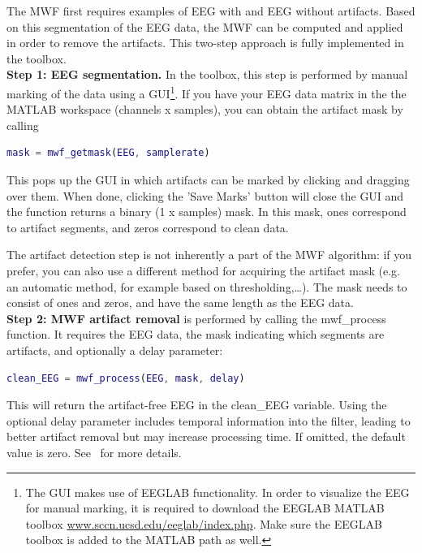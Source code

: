 \documentclass[11pt]{article}
\begin{document}
The MWF first requires examples of EEG with and EEG without artifacts. Based on this segmentation of the EEG data, the MWF can be computed and applied in order to remove the artifacts. This two-step approach is fully implemented in the toolbox.
\\

\textbf{Step 1: EEG segmentation.} In the toolbox, this step is performed by manual marking of the data using a GUI\footnote{The GUI makes use of EEGLAB functionality. In order to visualize the EEG for manual marking, it is required to download the EEGLAB MATLAB toolbox \url{www.sccn.ucsd.edu/eeglab/index.php}. Make sure the EEGLAB toolbox is added to the MATLAB path as well.}. If you have your EEG data matrix in the the MATLAB workspace (channels x samples), you can obtain the artifact mask by calling

\begin{lstlisting}[frame=single, language=matlab]
    mask = mwf_getmask(EEG, samplerate)
\end{lstlisting}

This pops up the GUI in which artifacts can be marked by clicking and dragging over them. When done, clicking the 'Save Marks' button will close the GUI and the function returns a binary (1 x samples) mask. In this mask, ones correspond to artifact segments, and zeros correspond to clean data. 

The artifact detection step is not inherently a part of the MWF algorithm: if you prefer, you can also use a different method for acquiring the artifact mask (e.g. an automatic method, for example based on thresholding,\ldots). The mask needs to consist of ones and zeros, and have the same length as the EEG data.
\\

\textbf{Step 2: MWF artifact removal} is performed by calling the mwf\_process function. It requires the EEG data, the mask indicating which segments are artifacts, and optionally a delay parameter:

\begin{lstlisting}[frame=single, language=matlab]
    clean_EEG = mwf_process(EEG, mask, delay)
\end{lstlisting}

This will return the artifact-free EEG in the clean\_EEG variable. Using the optional delay parameter includes temporal information into the filter, leading to better artifact removal but may increase processing time. If omitted, the default value is zero. See~\cite{somers2018generic} for more details.
\end{document}
